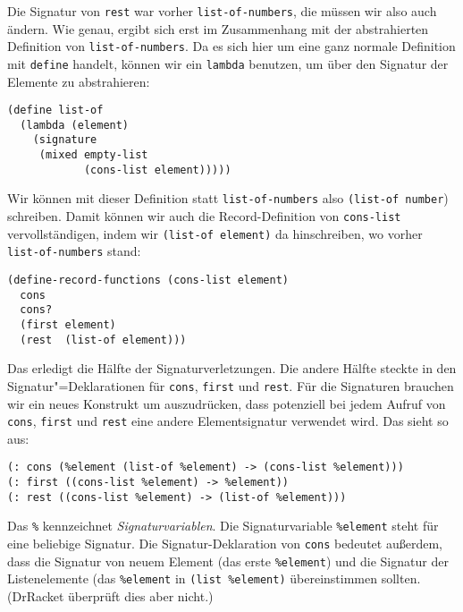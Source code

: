 Die Signatur von \lstinline{rest} war vorher
\lstinline{list-of-numbers}, die müssen wir also auch ändern.  Wie
genau, ergibt sich erst im Zusammenhang mit der abstrahierten
Definition von \lstinline{list-of-numbers}.  Da es sich hier um eine
ganz normale Definition mit \lstinline{define} handelt, können wir ein
\lstinline{lambda} benutzen, um über den Signatur der Elemente zu
abstrahieren:
%
\begin{lstlisting}
(define list-of
  (lambda (element)
    (signature
     (mixed empty-list
            (cons-list element)))))
\end{lstlisting}
%
Wir können mit dieser Definition statt \lstinline{list-of-numbers} also
\lstinline{(list-of number}) schreiben.  Damit können wir auch die
Record-Definition von \lstinline{cons-list} vervollständigen, indem
wir \lstinline{(list-of element)} da hinschreiben, wo vorher
\lstinline{list-of-numbers} stand:
%
\begin{lstlisting}
(define-record-functions (cons-list element)
  cons
  cons?
  (first element)
  (rest  (list-of element)))
\end{lstlisting}
%
Das erledigt die Hälfte der Signaturverletzungen.  Die andere Hälfte
steckte in den Signatur"=Deklarationen für \lstinline{cons},
\lstinline{first} und \lstinline{rest}.  Für die Signaturen brauchen
wir ein neues Konstrukt um auszudrücken, dass potenziell bei jedem
Aufruf von \lstinline{cons}, \lstinline{first} und \lstinline{rest}
eine andere Elementsignatur verwendet wird.  Das sieht so aus:
%
\begin{lstlisting}
(: cons (%element (list-of %element) -> (cons-list %element)))
(: first ((cons-list %element) -> %element))
(: rest ((cons-list %element) -> (list-of %element)))
\end{lstlisting}
%
Das \verb|%| kennzeichnet
\textit{Signaturvariablen}.  Die
Signaturvariable \lstinline{%element} steht für eine beliebige
Signatur.  Die Signatur-Deklaration von \lstinline{cons} bedeutet
außerdem, dass die Signatur von neuem Element (das erste \lstinline{%element})
und die Signatur der Listenelemente (das \lstinline{%element} in 
\lstinline{(list %element)} übereinstimmen sollten.  (DrRacket
  überprüft dies aber nicht.)


